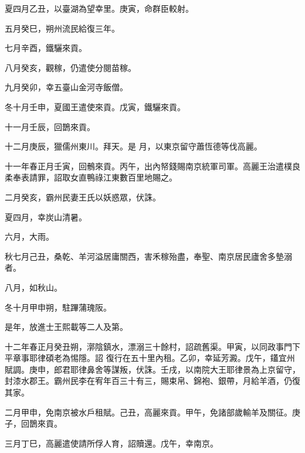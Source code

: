 \begin{pinyinscope}
 夏四月乙丑，以臺湖為望幸里。庚寅，命群臣較射。



 五月癸巳，朔州流民給復三年。



 七月辛酉，鐵驪來貢。



 八月癸亥，觀稼，仍遣使分閱苗稼。



 九月癸卯，幸五臺山金河寺飯僧。



 冬十月壬申，夏國王遣使來貢。戊寅，鐵驪來貢。



 十一月壬辰，回鵲來貢。



 十二月庚辰，獵儒州東川。拜天。是
 月，以東京留守蕭恆德等伐高麗。



 十一年春正月壬寅，回鶻來貢。丙午，出內帑錢賜南京統軍司軍。高麗王治遣樸良柔奉表請罪，詔取女直鴨祿江東數百里地賜之。



 二月癸亥，霸州民妻王氏以妖惑眾，伏誅。



 夏四月，幸炭山清暑。



 六月，大雨。



 秋七月己丑，桑乾、羊河溢居庸關西，害禾稼殆盡，奉聖、南京居民廬舍多墊溺者。



 八月，如秋山。



 冬十月甲申朔，駐蹕蒲瑰阪。



 是年，放進士王熙載等二人及第。



 十二年春正月癸丑朔，漷陰鎮水，漂溺三十餘村，詔疏舊渠。甲寅，以同政事門下平章事耶律碩老為惕隱。詔
 復行在五十里內租。乙卯，幸延芳澱。戊午，鑉宜州賦調。庚申，郎君耶律鼻舍等謀叛，伏誅。壬戌，以南院大王耶律景為上京留守，封漆水郡王。霸州民李在宥年百三十有三，賜束帛、錦袍、銀帶，月給羊酒，仍復其家。



 二月甲申，免南京被水戶租賦。己丑，高麗來貢。甲午，免諸部歲輸羊及關征。庚子，回鵲來貢。



 三月丁巳，高麗遣使請所俘人育，詔贖還。戊午，幸南京。




\end{pinyinscope}
